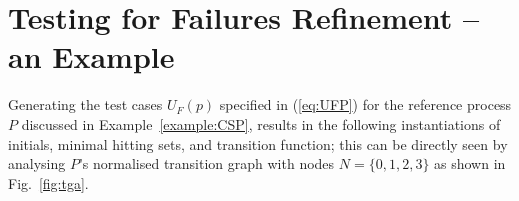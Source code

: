 \section{Testing for Failures Refinement -- an Example}
\label{sec:case}

%

Generating the test cases $U_F(p)$ specified in  (\ref{eq:UFP}) for the reference
process $P$ discussed in Example~\ref{example:CSP},
results in the following instantiations of initials, minimal hitting sets, and
transition function; this can be directly seen by analysing $P$'s normalised 
transition graph with nodes $N =\{0,1,2,3\}$ as shown in Fig.~\ref{fig:tga}.
 
